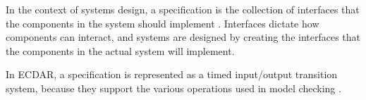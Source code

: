 
In the context of systems design, a specification is the collection of interfaces that the components in the system should implement \cite{ecdartheory}. 
Interfaces dictate how components can interact, and systems are designed by creating the interfaces that the components in the actual system will implement.

In ECDAR, a specification is represented as a timed input/output transition system, because they support the various operations used in model checking \cite{ecdartheory}. 